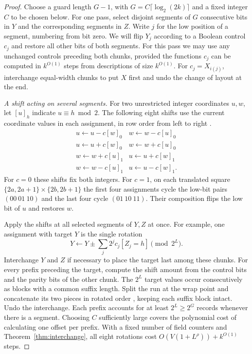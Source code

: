\begin{proof}
Choose a guard length $G-1$, with $G=C\lceil\log_2(2k)\rceil$ and a
fixed integer $C$ to be chosen below. For one pass, select disjoint
segments of $G$ consecutive bits in $Y$ and the corresponding segments
in $Z$. Write $j$ for the low position of a segment, numbering from bit
zero. We will flip $Y_j$ according to a Boolean control $c_j$ and
restore all other bits of both segments. For this pass we may use
any unchanged controls preceding both chunks, provided the functions
$c_j$ can be computed in $k^{O(1)}$ steps from descriptions of size
$k^{O(1)}$. For $c_j=X_{i(j)}$, interchange equal-width chunks to put
$X$ first and undo the change of layout at the end.

\emph{A shift acting on several segments.}
For two unrestricted integer coordinates $u,w$, let $[u]_h$ indicate
$u\equiv h\bmod2$. The following eight shifts use the current coordinate
values in each assignment, in row order from left to right
\cite[Lemma~13, Equations~(20)--(21)]{Tape}.
\[
\begin{array}{ll}
 u\leftarrow u-c[w]_0 & w\leftarrow w-c[u]_0\\
 u\leftarrow u+c[w]_0 & w\leftarrow w+c[u]_0\\
 w\leftarrow w+c[u]_1 & u\leftarrow u+c[w]_1\\
 w\leftarrow w-c[u]_1 & u\leftarrow u-c[w]_1 .
\end{array}
\]
For $c=0$ these shifts fix both integers. For $c=1$, on each
translated square $\{2a,2a+1\}\times\{2b,2b+1\}$ the first four
assignments cycle the low-bit pairs $(00\ 01\ 10)$ and the last four
cycle $(01\ 10\ 11)$. Their composition flips the low bit of $u$
and restores $w$.

Apply the shifts at all selected segments of $Y,Z$ at once. For
example, one assignment with target $Y$ is the single rotation
\[
      Y\longleftarrow
          Y\mathbin\pm\sum_j2^j c_j[Z_j=h]\pmod{2^L}.
\]
Interchange $Y$ and $Z$ if necessary to place the target last among
these chunks. For every prefix preceding the target, compute the shift
amount from the control bits and the parity bits of the other chunk.
The $2^L$ target values occur consecutively as blocks with a common
suffix length. Split the run at the wrap point and concatenate its two
pieces in rotated order \cite[Lemma~4]{Tape}, keeping each suffix
block intact. Undo the interchange. Each prefix accounts for at least
$2^L\ge2^G$ records whenever there is a segment. Choosing $C$
sufficiently large covers the polynomial cost of calculating one offset
per prefix. With a fixed number of field counters and
Theorem~\ref{thm:interchange}, all eight rotations cost
$O(V(1+L^\rho))+k^{O(1)}$ steps.


\end{proof}
